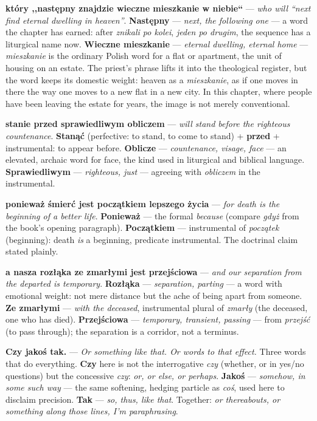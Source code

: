 \textbf{który ,,następny znajdzie wieczne mieszkanie w
niebie``} --- \textit{who will ``next find eternal dwelling
in heaven''}. \textbf{Następny} --- \textit{next, the
following one} --- a word the chapter has earned: after
\textit{znikali po kolei}, \textit{jeden po drugim}, the
sequence has a liturgical name now. \textbf{Wieczne
mieszkanie} --- \textit{eternal dwelling, eternal home}
--- \textit{mieszkanie} is the ordinary Polish word for
a flat or apartment, the unit of housing on an estate.
The priest's phrase lifts it into the theological register,
but the word keeps its domestic weight: heaven as a
\textit{mieszkanie}, as if one moves in there the way one
moves to a new flat in a new city. In this chapter, where
people have been leaving the estate for years, the image
is not merely conventional.

\textbf{stanie przed sprawiedliwym obliczem} ---
\textit{will stand before the righteous countenance}.
\textbf{Stanąć} (perfective: to stand, to come to stand)
+ \textbf{przed} + instrumental: to appear before.
\textbf{Oblicze} --- \textit{countenance, visage, face}
--- an elevated, archaic word for face, the kind used
in liturgical and biblical language. \textbf{Sprawiedliwym}
--- \textit{righteous, just} --- agreeing with
\textit{obliczem} in the instrumental.

\textbf{ponieważ śmierć jest początkiem lepszego życia}
--- \textit{for death is the beginning of a better life}.
\textbf{Ponieważ} --- the formal \textit{because} (compare
\textit{gdyż} from the book's opening paragraph).
\textbf{Początkiem} --- instrumental of \textit{początek}
(beginning): death \textit{is} a beginning, predicate
instrumental. The doctrinal claim stated plainly.

\textbf{a nasza rozłąka ze zmarłymi jest przejściowa} ---
\textit{and our separation from the departed is temporary}.
\textbf{Rozłąka} --- \textit{separation, parting} ---
a word with emotional weight: not mere distance but the
ache of being apart from someone. \textbf{Ze zmarłymi}
--- \textit{with the deceased}, instrumental plural of
\textit{zmarły} (the deceased, one who has died).
\textbf{Przejściowa} --- \textit{temporary, transient,
passing} --- from \textit{przejść} (to pass through);
the separation is a corridor, not a terminus.

\medskip

\textbf{Czy jakoś tak.} --- \textit{Or something like
that. Or words to that effect.} Three words that do
everything. \textbf{Czy} here is not the interrogative
\textit{czy} (whether, or in yes/no questions) but the
concessive \textit{czy}: \textit{or, or else, or
perhaps}. \textbf{Jakoś} --- \textit{somehow, in some
such way} --- the same softening, hedging particle as
\textit{coś}, used here to disclaim precision.
\textbf{Tak} --- \textit{so, thus, like that}.
Together: \textit{or thereabouts, or something along
those lines, I'm paraphrasing}.

